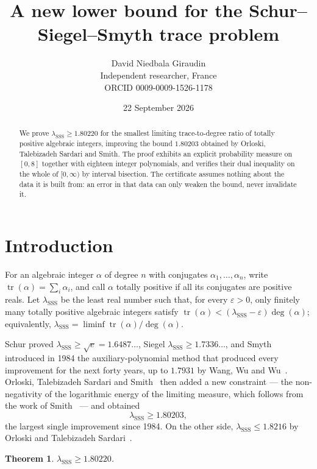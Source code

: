 \documentclass[11pt,a4paper]{article}
\title{A new lower bound for the Schur--Siegel--Smyth trace problem}
\author{David Niedbala Giraudin\\
\small Independent researcher, France\\
\small ORCID 0009-0009-1526-1178}
\date{22 September 2026}
\newtheorem{theorem}{Theorem}
\newcommand{\lsss}{\lambda_{\mathrm{SSS}}}
\begin{document}
\maketitle

\begin{abstract}
We prove $\lsss \ge 1.80220$ for the smallest limiting trace-to-degree ratio of
totally positive algebraic integers, improving the bound $1.80203$ obtained by
Orloski, Talebizadeh Sardari and Smith. The proof exhibits an explicit
probability measure on $[0,8]$ together with eighteen integer polynomials, and
verifies their dual inequality on the whole of $[0,\infty)$ by interval
bisection. The certificate assumes nothing about the data it is built from: an
error in that data can only weaken the bound, never invalidate it.
\end{abstract}

\section{Introduction}

For an algebraic integer $\alpha$ of degree $n$ with conjugates
$\alpha_1,\dots,\alpha_n$, write $\operatorname{tr}(\alpha)=\sum_i\alpha_i$, and
call $\alpha$ totally positive if all its conjugates are positive reals. Let
$\lsss$ be the least real number such that, for every $\varepsilon>0$, only
finitely many totally positive algebraic integers satisfy
$\operatorname{tr}(\alpha)<(\lsss-\varepsilon)\deg(\alpha)$; equivalently,
$\lsss=\liminf \operatorname{tr}(\alpha)/\deg(\alpha)$.

Schur proved $\lsss\ge\sqrt{e}=1.6487\ldots$, Siegel $\lsss\ge 1.7336\ldots$,
and Smyth introduced in 1984 the auxiliary-polynomial method that produced every
improvement for the next forty years, up to $1.7931$ by Wang, Wu and
Wu~\cite{WWW}. Orloski, Talebizadeh Sardari and Smith~\cite{OTS} then added a
new constraint --- the non-negativity of the logarithmic energy of the limiting
measure, which follows from the work of Smith~\cite{Smi} --- and obtained
\begin{equation}\label{eq:ots}
  \lsss \ge 1.80203,
\end{equation}
the largest single improvement since 1984. On the other side,
$\lsss\le 1.8216$ by Orloski and Talebizadeh Sardari~\cite{OT}.

\begin{theorem}\label{thm:main}
$\lsss \ge 1.80220$.
\end{theorem}
\end{document}
